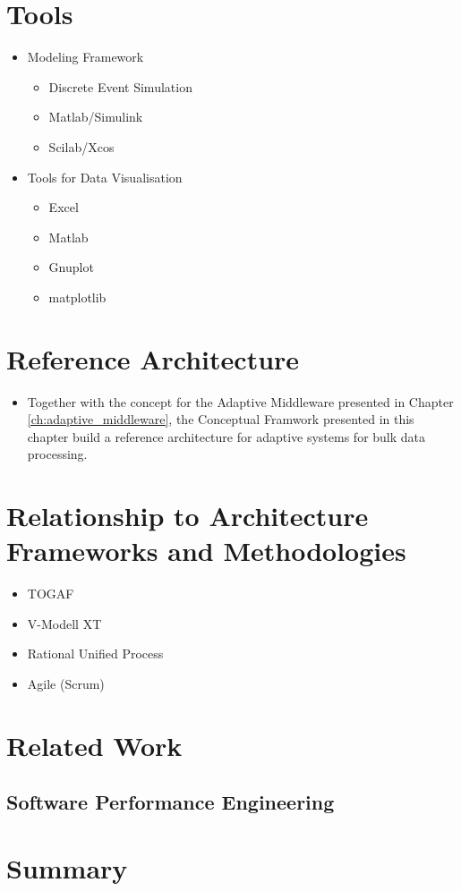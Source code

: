 \section{Tools} %
\label{sec:ch6_tools}

\begin{itemize}
	\item Modeling Framework
	\begin{itemize}
		\item Discrete Event Simulation
		\item Matlab/Simulink
		\item Scilab/Xcos
	\end{itemize}
	\item Tools for Data Visualisation
	\begin{itemize}
		\item Excel
		\item Matlab
		\item Gnuplot
		\item matplotlib
	\end{itemize}
\end{itemize}


\section{Reference Architecture}

\begin{itemize}
	\item Together with the concept for the Adaptive Middleware presented in Chapter \ref{ch:adaptive_middleware}, the Conceptual Framwork presented in this chapter build a reference architecture for adaptive systems for bulk data processing.
\end{itemize}

\section{Relationship to Architecture Frameworks and Methodologies} %
\label{sec:ch6_relation_frameworks}

\begin{itemize}
	\item TOGAF
	\item V-Modell XT
	\item Rational Unified Process
	\item Agile (Scrum)
\end{itemize}


\section{Related Work}

\subsection{Software Performance Engineering} %
\label{sub:software_performance_engineering}


\section{Summary} 
